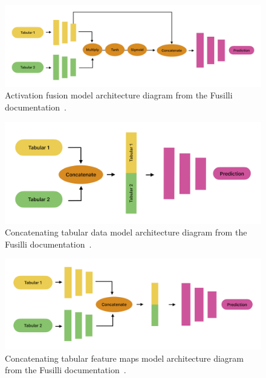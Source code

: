 \begin{figure}[h]
    \centering
    \includegraphics[width=1\linewidth]{figures//diagrams/ActivationFusion}
    \caption[Activation fusion model architecture diagram.]{Activation fusion model architecture diagram from the Fusilli documentation~\cite{townendFlorencejtFusilliFusilli2024}.}
    \label{fig:ActivationFusion}
\end{figure}

\begin{figure}[h]
    \centering
    \includegraphics[width=1\linewidth]{figures//diagrams/ConcatTabularData}
    \caption[Concatenating tabular data model architecture diagram.]{Concatenating tabular data model architecture diagram from the Fusilli documentation~\cite{townendFlorencejtFusilliFusilli2024}.}
    \label{fig:ConcatTabularData}
\end{figure}

\begin{figure}[h]
    \centering
    \includegraphics[width=1\linewidth]{figures//diagrams/ConcatTabularFeatureMaps}
    \caption[Concatenating tabular feature maps model architecture diagram.]{Concatenating tabular feature maps model architecture diagram from the Fusilli documentation~\cite{townendFlorencejtFusilliFusilli2024}.}
    \label{fig:ConcatTabularFeatureMaps}
\end{figure}

